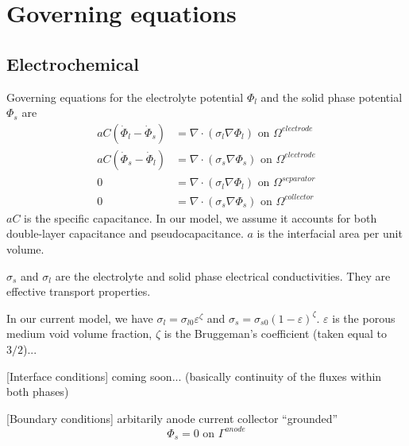 \documentclass[10pt, oneside]{article}   	%
\begin{document}
\section{Governing equations}
\subsection{Electrochemical}

Governing equations for the electrolyte potential $\Phi_l$ and the solid phase
potential $\Phi_s$ are
\begin{align}
aC (\dot{\Phi}_l - \dot{\Phi}_s) &= \nabla \cdot (\sigma_l \nabla \Phi_l) \text{ on } \Omega^{electrode} \\
aC (\dot{\Phi}_s - \dot{\Phi}_l) &= \nabla \cdot (\sigma_s \nabla \Phi_s) \text{ on } \Omega^{electrode} \\
0 &= \nabla \cdot (\sigma_l \nabla \Phi_l) \text{ on } \Omega^{separator} \\
0 &= \nabla \cdot (\sigma_s \nabla \Phi_s) \text{ on } \Omega^{collector}
\end{align}
$aC$ is the specific capacitance. In our model, we assume it accounts for both 
double-layer capacitance and pseudocapacitance. $a$ is the interfacial area
per unit volume.

$\sigma_s$ and $\sigma_l$ are the electrolyte and solid phase electrical
conductivities. They are effective transport properties.

In our current model, we have
$\sigma_l=\sigma_{l0}\varepsilon^\zeta$ and
$\sigma_s=\sigma_{s0}(1-\varepsilon)^\zeta$.
$\varepsilon$ is the porous medium void volume fraction,
$\zeta$ is the Bruggeman's coefficient (taken equal to $3/2$)...

[Interface conditions]
coming soon... (basically continuity of the fluxes within both phases)

[Boundary conditions]
arbitarily anode current collector ``grounded''
\begin{equation}
\Phi_s = 0 \text{\ on\ } \Gamma^{anode}
\end{equation}
\end{document}
